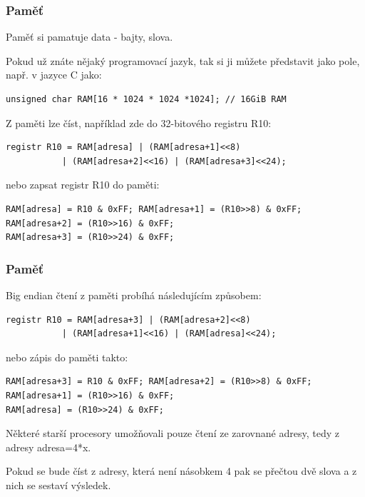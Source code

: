 \documentclass{beamer}
\begin{document}
\begin{frame}[fragile]
\frametitle{Paměť}

Paměť si pamatuje data - bajty, slova.

Pokud už znáte nějaký programovací jazyk, tak si ji můžete představit jako pole, např. v jazyce C jako:\\
\begin{verbatim}
unsigned char RAM[16 * 1024 * 1024 *1024]; // 16GiB RAM
\end{verbatim}

Z paměti lze číst, například zde do 32-bitového registru R10:\\
\begin{verbatim}
registr R10 = RAM[adresa] | (RAM[adresa+1]<<8)
           | (RAM[adresa+2]<<16) | (RAM[adresa+3]<<24);
\end{verbatim}
\bigskip

nebo zapsat registr R10 do paměti:\\
\begin{verbatim}
RAM[adresa] = R10 & 0xFF; RAM[adresa+1] = (R10>>8) & 0xFF;
RAM[adresa+2] = (R10>>16) & 0xFF;
RAM[adresa+3] = (R10>>24) & 0xFF;
\end{verbatim}

\end{frame}


\begin{frame}[fragile]
\frametitle{Paměť}

Big endian čtení z paměti probíhá následujícím způsobem:\\
\begin{verbatim}
registr R10 = RAM[adresa+3] | (RAM[adresa+2]<<8)
           | (RAM[adresa+1]<<16) | (RAM[adresa]<<24);
\end{verbatim}
\bigskip

nebo zápis do paměti takto:\\
\begin{verbatim}
RAM[adresa+3] = R10 & 0xFF; RAM[adresa+2] = (R10>>8) & 0xFF;
RAM[adresa+1] = (R10>>16) & 0xFF;
RAM[adresa] = (R10>>24) & 0xFF;
\end{verbatim}

Některé starší procesory umožňovali pouze čtení ze zarovnané adresy, tedy z adresy adresa=4*x.

Pokud se bude číst z adresy, která není násobkem 4 pak se přečtou dvě slova a z nich se sestaví výsledek.

\end{frame}
\end{document}
